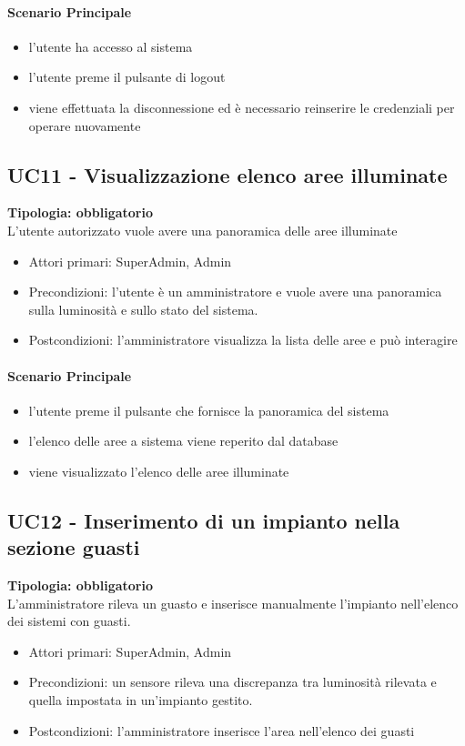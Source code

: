 \documentclass[12pt]{article}
\begin{document}
\paragraph{Scenario Principale}
\begin{itemize}
	\item l'utente ha accesso al sistema
	\item l'utente preme il pulsante di logout
	\item viene effettuata la disconnessione ed è necessario reinserire le credenziali per operare nuovamente
\end{itemize}


\subsection{UC11 - Visualizzazione elenco aree illuminate}
\textbf{Tipologia: obbligatorio} \\
L'utente autorizzato vuole avere una panoramica delle aree illuminate
\begin{itemize}
	\item Attori primari: SuperAdmin, Admin
	\item Precondizioni: l'utente è un amministratore e vuole avere una panoramica sulla luminosità e sullo stato del sistema.
	\item Postcondizioni: l'amministratore visualizza la lista delle aree e può interagire
\end{itemize}
\paragraph{Scenario Principale}
\begin{itemize}
	\item l'utente preme il pulsante che fornisce la panoramica del sistema
	\item l'elenco delle aree a sistema viene reperito dal database
	\item viene visualizzato l'elenco delle aree illuminate
\end{itemize}


\subsection{UC12 - Inserimento di un impianto nella sezione guasti}
\textbf{Tipologia: obbligatorio} \\
L'amministratore rileva un guasto e inserisce manualmente l'impianto nell'elenco dei sistemi con guasti.
\begin{itemize}
	\item Attori primari: SuperAdmin, Admin
	\item Precondizioni: un sensore rileva una discrepanza tra luminosità rilevata e quella impostata in un'impianto gestito.
	\item Postcondizioni: l'amministratore inserisce l'area nell'elenco dei guasti
\end{itemize}
\end{document}
